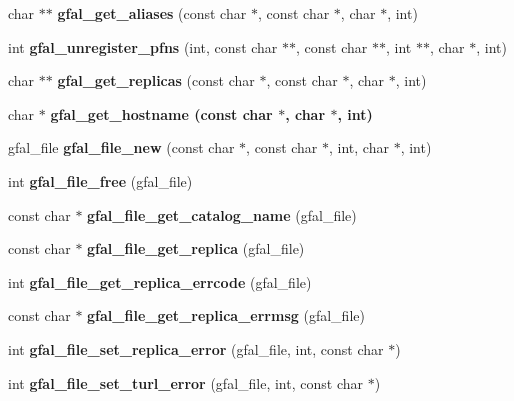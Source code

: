 \begin{CompactItemize}
\item 
char $\ast$$\ast$ \textbf{gfal\_\-get\_\-aliases} (const char $\ast$, const char $\ast$, char $\ast$, int)\label{group__internal__group_g25d4ae6bef6570590efbc8548e7d79e2}

\item 
int \textbf{gfal\_\-unregister\_\-pfns} (int, const char $\ast$$\ast$, const char $\ast$$\ast$, int $\ast$$\ast$, char $\ast$, int)\label{group__internal__group_g70f889fa2436723fb7b3cff20b661f21}

\item 
char $\ast$$\ast$ \textbf{gfal\_\-get\_\-replicas} (const char $\ast$, const char $\ast$, char $\ast$, int)\label{group__internal__group_gbd0a581309f65e07a5e28d442f07b169}

\item 
char $\ast$ \bf{gfal\_\-get\_\-hostname} (const char $\ast$, char $\ast$, int)
\item 
gfal\_\-file \textbf{gfal\_\-file\_\-new} (const char $\ast$, const char $\ast$, int, char $\ast$, int)\label{group__internal__group_g4c083c77e3b95b63f7a66d9cad7d24b4}

\item 
int \textbf{gfal\_\-file\_\-free} (gfal\_\-file)\label{group__internal__group_g564d0244067d6e1d424cea5ec1336be6}

\item 
const char $\ast$ \textbf{gfal\_\-file\_\-get\_\-catalog\_\-name} (gfal\_\-file)\label{group__internal__group_g8e5135cef19dfa4106dc8a6da1b78721}

\item 
const char $\ast$ \textbf{gfal\_\-file\_\-get\_\-replica} (gfal\_\-file)\label{group__internal__group_ga3feb45524d1a8e8cccd33249ee3ccb7}

\item 
int \textbf{gfal\_\-file\_\-get\_\-replica\_\-errcode} (gfal\_\-file)\label{group__internal__group_g19b575e12fff918eda15bf9933705f9a}

\item 
const char $\ast$ \textbf{gfal\_\-file\_\-get\_\-replica\_\-errmsg} (gfal\_\-file)\label{group__internal__group_ga8418371e63e1c3ee5da57b0b75a0a32}

\item 
int \textbf{gfal\_\-file\_\-set\_\-replica\_\-error} (gfal\_\-file, int, const char $\ast$)\label{group__internal__group_g5de1931dff2c84de9db70f88cfe85662}

\item 
int \textbf{gfal\_\-file\_\-set\_\-turl\_\-error} (gfal\_\-file, int, const char $\ast$)\label{group__internal__group_gafd5eb622406793e29b3aaf4d82ca399}


\end{CompactItemize}
